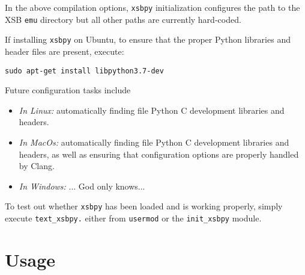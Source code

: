 \noindent
In the above compilation options, {\tt xsbpy} initialization
configures the path to the XSB {\tt emu} directory but all other paths
are currently hard-coded.

If installing {\tt xsbpy} on Ubuntu, to ensure that the proper Python
libraries and header files are present, execute:

{\tt sudo apt-get install libpython3.7-dev}

Future configuration tasks include

\begin{itemize}
\item {\em In Linux:} automatically finding file Python C development
  libraries and headers.
\item {\em In MacOs:} automatically finding file Python C development
  libraries and headers, as well as ensuring that configuration
  options are properly handled by Clang.
\item {\em In Windows:} ... God only knows...
\end{itemize}

To test out whether {\tt xsbpy} has been loaded and is working
properly, simply execute {\tt text\_xsbpy.} either from {\tt usermod}
or the {\tt init\_xsbpy} module.

\section{Usage}

